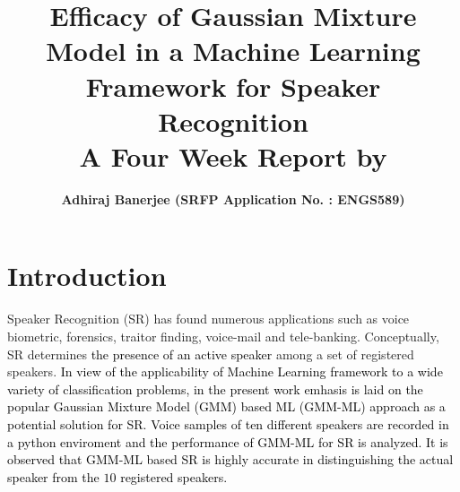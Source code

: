 \documentclass{article}
\title{\textbf{Efficacy of Gaussian Mixture Model in a Machine Learning Framework for Speaker Recognition \\ A Four Week Report by}}
\author{\textbf{Adhiraj Banerjee (SRFP Application No. : ENGS589)}}
\begin{document}
\maketitle

\section{\textbf{{Introduction}}}
Speaker Recognition (SR) has found numerous applications such as voice biometric, forensics, traitor finding, voice-mail and  tele-banking. Conceptually, SR determines \textcolor{black}{the presence of an active speaker} among a set of registered speakers. %
 \textcolor{black}{In view of the applicability of {Machine Learning} framework to a wide variety of classification problems, in the present work emhasis is laid on the popular Gaussian Mixture Model (GMM) based ML (GMM-ML) approach as a potential solution for SR. Voice samples of ten different speakers are recorded in a python enviroment and the performance of GMM-ML for SR is analyzed. It is observed that GMM-ML based SR is highly accurate in distinguishing the actual speaker from the $10$ registered speakers.}
\end{document}
